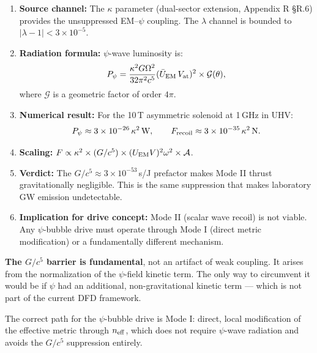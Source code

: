 \documentclass[11pt]{article}
\newcommand{\neff}{n_{\rm eff}}
\begin{document}
\begin{tcolorbox}[colback=blue!5!white, colframe=blue!50!black,
  title=Mode II Thrust: Key Results]
\begin{enumerate}
\item \textbf{Source channel:} The $\kappa$ parameter (dual-sector
  extension, Appendix R \S R.6) provides the unsuppressed EM--$\psi$
  coupling. The $\lambda$ channel is bounded to $|\lambda-1| < 3\times10^{-5}$.

\item \textbf{Radiation formula:} $\psi$-wave luminosity is:
\begin{equation*}
P_\psi = \frac{\kappa^2 G \Omega^2}{32\pi^2 c^5}
  (\bar{U}_{\rm EM}\,V_{\rm at})^2 \times \mathcal{G}(\theta),
\end{equation*}
where $\mathcal{G}$ is a geometric factor of order $4\pi$.

\item \textbf{Numerical result:} For the 10\,T asymmetric solenoid at
  1\,GHz in UHV:
\begin{equation*}
P_\psi \approx 3 \times 10^{-26}\,\kappa^2\,\text{W}, \qquad
F_{\rm recoil} \approx 3 \times 10^{-35}\,\kappa^2\,\text{N}.
\end{equation*}

\item \textbf{Scaling:} $F \propto \kappa^2 \times (G/c^5) \times
  (U_{\rm EM} V)^2 \omega^2 \times \mathcal{A}$.

\item \textbf{Verdict:} The $G/c^5 \approx 3 \times 10^{-53}$\,s/J
  prefactor makes Mode II thrust gravitationally negligible. This is
  the same suppression that makes laboratory GW emission undetectable.

\item \textbf{Implication for drive concept:} Mode II (scalar wave
  recoil) is not viable. Any $\psi$-bubble drive must operate through
  Mode I (direct metric modification) or a fundamentally different
  mechanism.
\end{enumerate}
\end{tcolorbox}

\begin{tcolorbox}[colback=red!5!white, colframe=red!50!black,
  title=Critical Finding]
\textbf{The $G/c^5$ barrier is fundamental}, not an artifact of weak
coupling. It arises from the normalization of the $\psi$-field kinetic
term. The only way to circumvent it would be if $\psi$ had an additional,
non-gravitational kinetic term --- which is not part of the current DFD
framework.

The correct path for the $\psi$-bubble drive is Mode I: direct, local
modification of the effective metric through $\neff$, which does not
require $\psi$-wave radiation and avoids the $G/c^5$ suppression entirely.
\end{tcolorbox}
\end{document}
